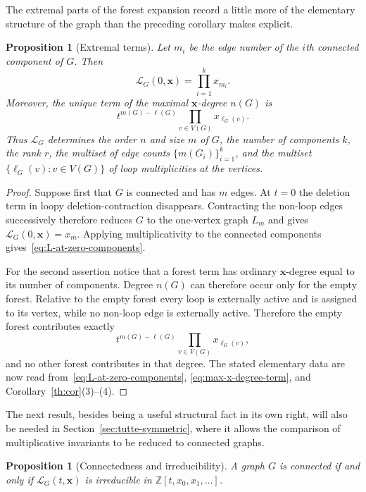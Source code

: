 \documentclass[11pt]{article}
\theoremstyle{plain}
\newtheorem{proposition}[theorem]{Proposition}
\theoremstyle{definition}
\renewcommand{\mathcal}{\mathscr}
\newcommand{\LL}{\mathcal{L}}    %
\newcommand{\bx}{\mathbf{x}}
\newcommand{\ZZ}{\mathbb Z}
\numberwithin{equation}{section}
\begin{document}
The extremal parts of the forest expansion record a little more
of the elementary structure of the graph than the preceding corollary makes
explicit.

\begin{proposition}[Extremal terms]\label{prop:extremal-terms}
  Let $m_i$ be the edge number of the $i$th connected component of $G$.  Then
\begin{equation}\label{eq:L-at-zero-components}
   \LL_G(0,\bx)=\prod_{i=1}^{k}x_{m_i}.
\end{equation}
Moreover, the unique term of the maximal $\bx$-degree $n(G)$ is
\begin{equation}\label{eq:max-x-degree-term}
   t^{m(G)-\ell(G)}\prod_{v\in V(G)}x_{\ell_G(v)}.
\end{equation}
Thus $\LL_G$ determines the order $n$ and size $m$ of $G$, the number  of components $k$, the rank $r$, the multiset of edge counts
$\{m(G_i)\}_{i=1}^k$, and the multiset
$\{\ell_G(v):v\in V(G)\}$ of loop multiplicities at the vertices.
\end{proposition}

\begin{proof}
Suppose first that $G$ is connected and has $m$ edges.  At $t=0$ the deletion
term in loopy deletion-contraction disappears.  Contracting the non-loop
edges successively therefore reduces $G$ to the one-vertex graph $L_m$ and
gives $\LL_G(0,\bx)=x_m$.  Applying multiplicativity to the connected
components gives~\eqref{eq:L-at-zero-components}.

For the second assertion notice that a forest term has ordinary $\bx$-degree equal to
its number of components.  Degree $n(G)$ can therefore occur only for the empty forest.
Relative to the empty forest every loop is externally active and is assigned to its vertex, while no non-loop edge is externally active.
Therefore the empty forest contributes exactly
\[
   t^{m(G)-\ell(G)}\prod_{v\in V(G)}x_{\ell_G(v)},
\]
and no other forest contributes in that degree.  The stated elementary data
are now read from~\eqref{eq:L-at-zero-components},
\eqref{eq:max-x-degree-term}, and Corollary~\ref{th:cor}(3)--(4).
\end{proof}

The next result, besides being a useful structural fact in its own right,  will
also be needed in Section~\ref{sec:tutte-symmetric}, where it allows the comparison of multiplicative invariants to be reduced to connected graphs.

\begin{proposition}[Connectedness and irreducibility]
\label{prop:L-irreducible}
A graph $G$ is connected if and only if $\LL_G(t,\bx)$ is irreducible in
$\ZZ[t,x_0,x_1,\ldots]$.
\end{proposition}
\end{document}

